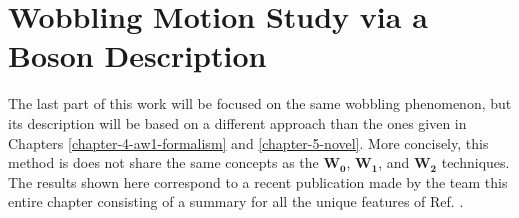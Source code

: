 \chapter{Wobbling Motion Study via a Boson Description}
\label{extra-chapter-new-boson}

The last part of this work will be focused on the same wobbling phenomenon, but its description will be based on a different approach than the ones given in Chapters \ref{chapter-4-aw1-formalism} and \ref{chapter-5-novel}. More concisely, this method is does not share the same concepts as the $\mathbf{W_0}$, $\mathbf{W_1}$, and $\mathbf{W_2}$ techniques. The results shown here correspond to a recent publication made by the team \cite{raduta2020new} this entire chapter consisting of a summary for all the unique features of Ref. \cite{raduta2020new}. 